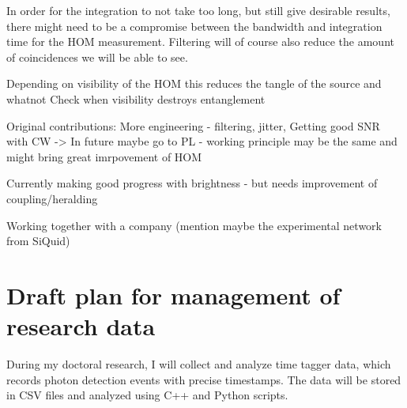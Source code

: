 \documentclass{article}
\theoremstyle{mytheoremstyle}
\theoremstyle{mytheoremstyle}
\theoremstyle{myproblemstyle}
\begin{document}
In order for the integration to not take too long, but still give desirable results, there might need to be a compromise
between the bandwidth and integration time for the HOM measurement.
Filtering will of course also reduce the amount of coincidences we will be able to see.

Depending on visibility of the HOM this reduces the tangle of the source and whatnot
Check when visibility destroys entanglement

Original contributions: More engineering - filtering, jitter,
Getting good SNR with CW -> In future maybe go to PL - working principle may be the same and might bring great imrpovement of HOM

Currently making good progress with brightness - but needs improvement of coupling/heralding

Working together with a company (mention maybe the experimental network from SiQuid)

\section{Draft plan for management of research data}
During my doctoral research, I will collect and analyze time tagger data,
which records photon detection events with precise timestamps.
The data will be stored in CSV files and analyzed using C++ and Python scripts.
\end{document}
